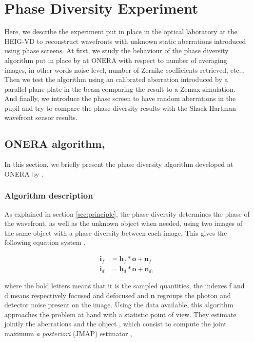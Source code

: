 
\chapter{Phase Diversity Experiment} 
\label{ch:PDExp}

Here, we describe the experiment put in place in the optical laboratory at the HEIG-VD to reconstruct wavefronts with unknown static aberrations introduced using phase screens. At first, we study the  behaviour of the phase diversity algorithm put in place by \citet{mugnier_2006} at ONERA with respect to number of averaging images, in other words noise level, number of Zernike coefficients retrieved, etc... Then we test the algorithm using an calibrated aberration introduced by a parallel plane plate in the beam comparing the result to a Zemax simulation. And finally, we introduce the phase screen to have random aberrations in the pupil and try to compare the phase diversity results with the Shack Hartman wavefront sensor results.

\section[ONERA algorithm]{ONERA algorithm, \citet{mugnier_2006}}
\label{sec:ONERAalgo}

In this section, we briefly present the phase diversity algorithm developed at ONERA by \citet{mugnier_2006}.

\subsection{Algorithm description}
\label{subsec:OneraAlgoDesc}

As explained in section \ref{sec:principle}, the phase diversity determines the phase of the wavefront, as well as the unknown object when needed, using two images of the same object with a phase diversity between each image. This gives the following equation system \citep[p.11]{mugnier_2006},

\begin{align}
\mathbf{i}_f &= \mathbf{h}_f \ast \mathbf{o} + \mathbf{n}_f \\
\mathbf{i}_d &= \mathbf{h}_d \ast \mathbf{o} + \mathbf{n}_d,
\label{eqt:systemEQT}
\end{align}

where the bold letters means that it is the sampled quantities, the indexes f and d means respectively focused and defocused and $\mathbf{n}$ regroups the photon and detector noise present on the image. Using the data available, this algorithm approaches the problem at hand with a statistic point of view. They estimate jointly the aberrations and the object \citep{Paxman1992}, which consist to compute the joint maximum \textit{a posteriori} (JMAP) estimator \citep[p.17]{mugnier_2006},

